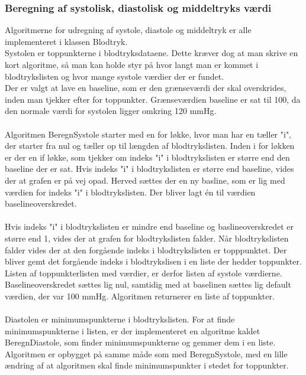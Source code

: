 \subsubsection{Beregning af systolisk, diastolisk og middeltryks værdi}
Algoritmerne for udregning af systole, diastole og middeltryk er alle implementeret i klassen Blodtryk. \\
Systolen er toppunkterne i blodtryksdataene. Dette kræver dog at man skrive en kort algoritme, så man kan holde styr på hvor langt man er kommet i blodtrykslisten og hvor mange systole værdier der er fundet.\\
Der er valgt at lave en baseline, som er den grænseværdi der skal overskrides, inden man tjekker efter for toppunkter.  Grænseværdien baseline er sat til 100, da den normale værdi for systolen ligger omkring 120 mmHg.  \\\\
Algoritmen BeregnSystole starter med en for løkke, hvor man har en tæller "i", der starter fra nul og tæller op til længden af blodtrykslisten. Inden i for løkken er der en if løkke, som tjekker om indeks "i" i blodtrykslisten er større end den baseline der er sat. Hvis indeks "i" i blodtrykslisten er større end baseline, vides der at grafen er på vej opad. Herved sættes der en ny basline, som er lig med værdien for indeks "i" i blodtrykslisten.  Der bliver lagt én til værdien baselineoverskredet.\\\\ 
Hvis indeks "i" i blodtrykslisten er mindre end baseline og baslineoverskredet er større end 1, vides der at grafen for blodtrykslisten falder. Når blodtrykslisten falder vides der at den forgående indeks i blodtrykslisten er topppunktet. Der bliver gemt det forgående indeks i blodtrykslisen i en liste der hedder toppunkter. Listen af toppunkterlisten med værdier, er derfor listen af systole værdierne. Baselineoverskredet sættes lig nul, samtidig med at baselinen sættes lig default værdien, der var 100 mmHg. Algoritmen returnerer en liste af toppunkter.\\\\
Diastolen er minimumspunkterne i blodtrykslisten. For at finde minimumspunkterne i listen, er der implementeret en algoritme kaldet BeregnDiastole, som finder minimumspunkterne og gemmer dem i en liste.\\
Algoritmen er opbygget på samme måde som med BeregnSystole, med en lille ændring af at algoritmen skal finde minimumspunkter i stedet for toppunkter.\\
